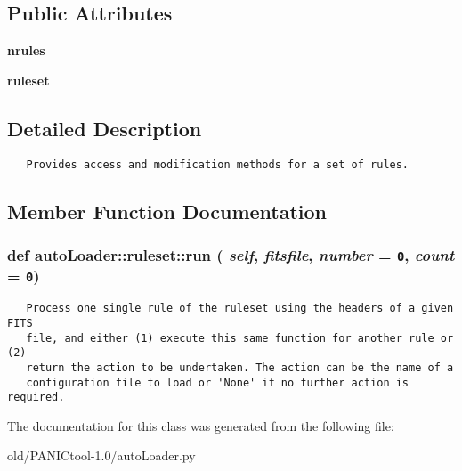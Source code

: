 \subsection*{Public Attributes}
\begin{CompactItemize}
\item 
\textbf{nrules}\label{classautoLoader_1_1ruleset_1c2c1ccfa953354974c55cff59dba837}

\item 
\textbf{ruleset}\label{classautoLoader_1_1ruleset_11bc2f9612829c91d3e2d6ba03a9103f}

\end{CompactItemize}


\subsection{Detailed Description}


\footnotesize\begin{verbatim}
   Provides access and modification methods for a set of rules.
\end{verbatim}
\normalsize
 



\subsection{Member Function Documentation}
\subsubsection{\setlength{\rightskip}{0pt plus 5cm}def auto\-Loader::ruleset::run ( {\em self},  {\em fitsfile},  {\em number} = {\tt 0},  {\em count} = {\tt 0})}\label{classautoLoader_1_1ruleset_5888cdc5581bd34a6ed7ce80e78f766c}




\footnotesize\begin{verbatim}
   Process one single rule of the ruleset using the headers of a given FITS
   file, and either (1) execute this same function for another rule or (2)
   return the action to be undertaken. The action can be the name of a
   configuration file to load or 'None' if no further action is required.
\end{verbatim}
\normalsize
 

The documentation for this class was generated from the following file:\begin{CompactItemize}
\item 
old/PANICtool-1.0/auto\-Loader.py\end{CompactItemize}
